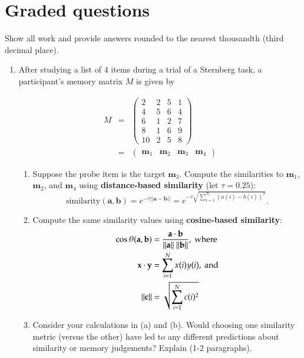 \documentclass[11pt]{article}
\begin{document}
\section*{Graded questions}
Show all work and provide answers rounded to the nearest thousandth (third
decimal place).
\begin{enumerate}
\item After studying a list of 4 items during a trial of a Sternberg
  task, a participant's memory matrix $M$ is given by

\begin{eqnarray*}
M&=&
\left( 
\begin{array}{cccc}
2 & 2 & 5 & 1\\
4 & 5 & 6 & 4\\
6 & 1 & 2 & 7\\
8 & 1 & 6 & 9\\
10 & 2 & 5 & 8
\end{array} 
\right) \\
&=&
\left( 
\begin{array}{cccc}
\mathbf{m}_1 & \mathbf{m}_2 & \mathbf{m}_3 & \mathbf{m}_4  
 \end{array} 
\right) \nonumber
\end{eqnarray*}
\begin{enumerate}
\item Suppose the probe item is the target $\mathbf{m}_3$.  Compute
  the similarities to $\mathbf{m}_1$, $\mathbf{m}_2$, and
  $\mathbf{m}_4$ using \textbf{distance-based similarity} (let $\tau =
  0.25$):
\[
\mathrm{similarity}(\mathbf{a}, \mathbf{b}) = e^{-\tau||\mathbf{a} -
  \mathbf{b}||} = e^{-\tau\sqrt{\sum_{i=1}^N(a(i) - b(i))^2}}.
\]
\item Compute the same similarity values using
  \textbf{cosine-based similarity}:
\begin{align}
\cos\theta(\mathbf{a}, \mathbf{b}) &=
\frac{\mathbf{a}\cdot\mathbf{b}}{||\mathbf{a}||~||\mathbf{b}||},~\mathrm{where}\notag\\
\mathbf{x}\cdot\mathbf{y} &= \sum_{i=1}^N x(i)y(i),~\mathrm{and}\notag\\
||\mathbf{c}|| &= \sqrt{\sum_{i=1}^N c(i)^2}\notag\\
\end{align}

\item Consider your calculations in (a) and (b).  Would
  choosing one similarity metric (versus the other) have led to any
  different predictions about similarity or memory judgements?
  Explain (1-2 paragraphs).


\end{enumerate}
\end{enumerate}
\end{document}
